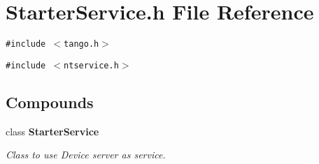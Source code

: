 \section{Starter\-Service.h File Reference}
\label{StarterService_8h}
{\tt \#include $<$tango.h$>$}\par
{\tt \#include $<$ntservice.h$>$}\par
\subsection*{Compounds}
\begin{CompactItemize}
\item 
class {\bf Starter\-Service}
\begin{CompactList}\small\item\em Class to use Device server as service.\item\end{CompactList}\end{CompactItemize}
